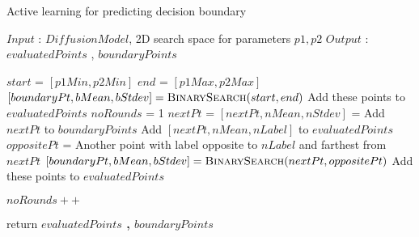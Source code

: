 \begin{algorithm}

\caption{Active learning for predicting decision boundary}
\label{alg:methodAlgo}
\begin{algorithmic}[1]

\State $Input$ : $DiffusionModel$,
2D search space for parameters $p1,p2$ 
\State $Output$ : $evaluatedPoints$ , $boundaryPoints$

    \State $start$  = $[p1Min, p2Min]$
    \State $end$  = $[p1Max, p2Max]$
    \State $[boundaryPt, bMean, bStdev] = \Call{BinarySearch}{start,end}$
    \State {} Add these points to $evaluatedPoints$
    \State $noRounds$ = 1
        \State \textbf{\textit{$nextPt$}} = 
        \State $[nextPt, nMean, nStdev]$ = 
            \State Add $nextPt$ to $boundaryPoints$
        \Else 
            \State Add $[nextPt, nMean, nLabel]$ to $evaluatedPoints$
        \EndIf
        \State $oppositePt$ = Another point with label opposite to $nLabel$ and farthest from $nextPt$
        \State $[boundaryPt, bMean, bStdev] = \Call{BinarySearch}{nextPt,oppositePt}$
        \State {} Add these points to $evaluatedPoints$
        
        \State $noRounds++$
        
     \EndWhile
    
    \State return \textbf{$evaluatedPoints$ , $boundaryPoints$}

\EndProcedure
\end{algorithmic}
\end{algorithm}


